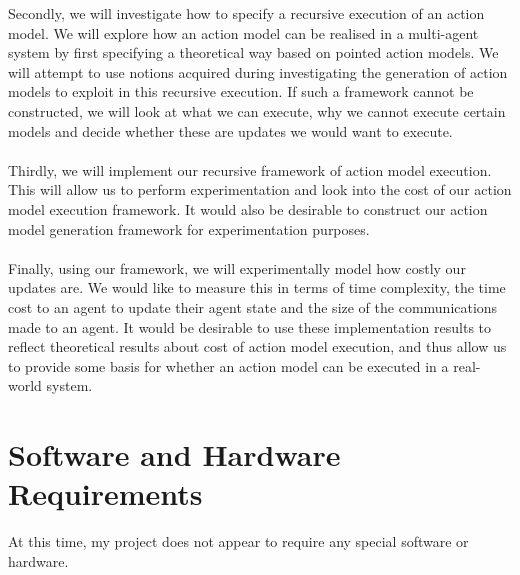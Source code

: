 Secondly, we will investigate how to specify a recursive execution of an action
model.
We will explore how an action model can be realised in a multi-agent system by
first specifying a theoretical way based on pointed action models.
We will attempt to use notions acquired during investigating the generation of
action models to exploit in this recursive execution.
If such a framework cannot be constructed, we will look at what we can execute,
why we cannot execute certain models and decide whether these are updates we
would want to execute.\\
\\
Thirdly, we will implement our recursive framework of action model execution.
This will allow us to perform experimentation and look into the cost of our
action model execution framework.
It would also be desirable to construct our action model generation framework
for experimentation purposes.\\
\\
Finally, using our framework, we will experimentally model how costly our
updates are.
We would like to measure this in terms of time complexity, the time cost to an agent to update
their agent state and the size of the communications made to an agent.
It would be desirable to use these implementation results to reflect theoretical
results about cost of action model execution, and thus allow us to provide some
basis for whether an action model can be executed in a real-world system.
%
\section{Software and Hardware Requirements}
At this time, my project does not appear to require any special software or hardware.

